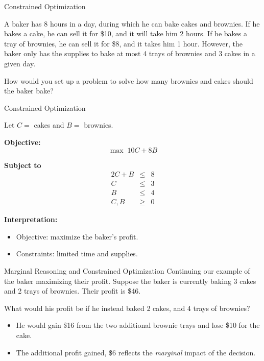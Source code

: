\documentclass{beamer}
\begin{document}
\begin{frame}{Constrained Optimization}

  \bigskip
  A baker has 8 hours in a day, during which he can bake cakes and brownies. If he bakes a cake, he can sell it for \$10, and it will take him 2 hours. If he bakes a tray of brownies, he can sell it for \$8, and it takes him 1 hour. However, the baker only has the supplies to bake at most 4 trays of brownies and 3 cakes in a given day. 
  
  \medskip
  How would you set up a problem to solve how many brownies and cakes should the baker bake?
\end{frame}
\begin{frame}{Constrained Optimization}

Let \(C=\) cakes and \(B=\) brownies.

\textbf{Objective:}
\[
\max\; 10C+8B
\]

\textbf{Subject to}
\[
\begin{array}{rcl}
2C+B &\le& 8\\
C &\le& 3\\
B &\le& 4\\
C,B &\ge& 0
\end{array}
\]

\textbf{Interpretation:}
\begin{itemize}
\item Objective: maximize the baker's profit.
\item Constraints: limited time and supplies.
\end{itemize}

\end{frame}
\begin{frame}{Marginal Reasoning and Constrained Optimization}
  Continuing our example of the baker maximizing their profit. Suppose the baker is currently baking 3 cakes and 2 trays of brownies. Their profit is \$46.

  \bigskip
  What would his profit be if he instead baked 2 cakes, and 4 trays of brownies? 
  
\pause
  \begin{itemize}
    \item He would gain \$16 from the two additional brownie trays and lose \$10 for the cake.
    \item The additional profit gained, \$6 reflects the \textit{marginal} impact of the decision.
  \end{itemize}
\end{frame}
\end{document}
